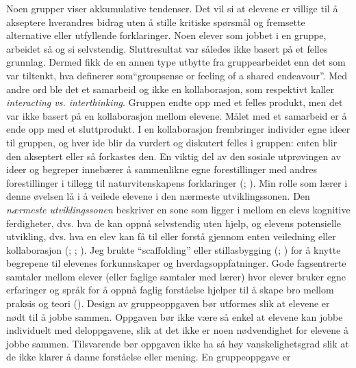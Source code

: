 \documentclass[12pt,twoside,onecolumn,norsk]{article}
\begin{document}
\newline
Noen grupper viser akkumulative tendenser. Det vil si at elevene er villige til å akseptere 
hverandres bidrag uten å stille kritiske spørsmål og fremsette alternative eller utfyllende 
forklaringer. Noen elever som jobbet i en gruppe, arbeidet så og si selvstendig. Sluttresultat 
var således ikke basert på et felles grunnlag. Dermed fikk de en annen type utbytte fra 
gruppearbeidet enn det som var tiltenkt, hva  definerer som``groupsense 
or feeling of a shared endeavour''. Med andre ord ble det et samarbeid og ikke en kollaborasjon, 
som  respektivt kaller \emph{interacting vs. interthinking}. Gruppen endte opp 
med et felles produkt, men det var ikke basert på en kollaborasjon mellom elevene. Målet med 
et samarbeid er å ende opp med et sluttprodukt. I en kollaborasjon frembringer individer egne 
ideer til gruppen, og hver ide blir da vurdert og diskutert felles i gruppen: enten blir 
den akseptert eller så forkastes den. En viktig del av den sosiale utprøvingen av ideer og 
begreper innebærer å sammenlikne egne forestillinger med andres forestillinger i tillegg til 
naturvitenskapens forklaringer (; ).
\newline
\newline
Min rolle som lærer i denne øvelsen lå i å veilede elevene i den nærmeste utviklingssonen. Den 
\emph{nærmeste utviklingssonen} beskriver en sone som ligger i mellom en elevs kognitive 
ferdigheter, dvs. hva de kan oppnå selvstendig uten hjelp, og elevens potensielle utvikling, 
dvs. hva en elev kan få til eller forstå gjennom enten veiledning eller kollaborasjon 
(; ; ). Jeg brukte 
``scaffolding'' eller stillasbygging (; ) for å knytte 
begrepene til elevenes forkunnskaper og hverdagsoppfatninger. Gode fagsentrerte samtaler 
mellom elever (eller faglige samtaler med lærer) hvor elever bruker egne erfaringer og 
språk for å oppnå faglig forståelse hjelper til å skape bro mellom praksis og teori 
().
\newline
\newline
Design av gruppeoppgaven bør utformes slik at elevene er nødt til å jobbe sammen. Oppgaven bør 
ikke være så enkel at elevene kan jobbe individuelt med deloppgavene, slik at det ikke er noen 
nødvendighet for elevene å jobbe sammen. Tilsvarende bør oppgaven ikke ha så høy 
vanskelighetsgrad slik at de ikke klarer å danne forståelse eller mening. En gruppeoppgave er 
\end{document}
